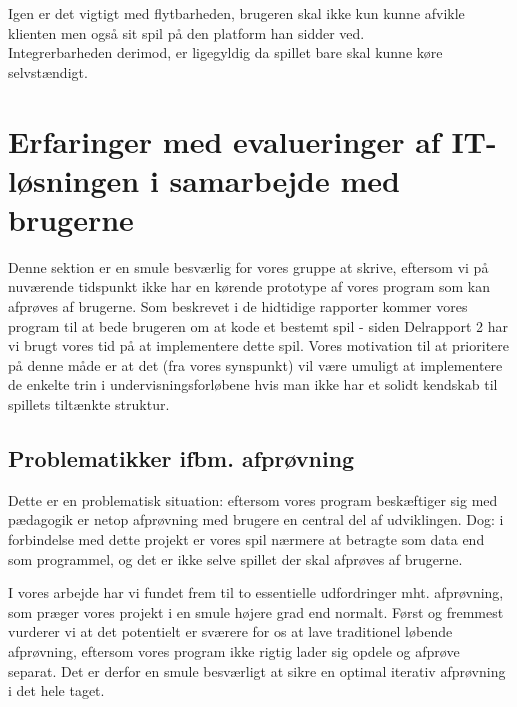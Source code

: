 \documentclass[10pt,a4paper,danish]{article}
\begin{document}
Igen er det vigtigt med flytbarheden, brugeren skal ikke kun kunne afvikle klienten men også sit spil på den platform han sidder ved.
\\

Integrerbarheden derimod, er ligegyldig da spillet bare skal kunne køre selvstændigt.



\section{Erfaringer med evalueringer af IT-løsningen i samarbejde med brugerne}
Denne sektion er en smule besværlig for vores gruppe at skrive, eftersom vi på nuværende
tidspunkt ikke har en kørende prototype af vores program som kan afprøves af brugerne. 
Som beskrevet i de hidtidige rapporter kommer vores program til at bede brugeren om at kode
et bestemt spil - siden Delrapport 2 har vi brugt vores tid på at implementere dette spil.
Vores motivation til at prioritere på denne måde er at det (fra vores synspunkt) vil være
umuligt at implementere de enkelte trin i undervisningsforløbene hvis man ikke har et 
solidt kendskab til spillets tiltænkte struktur.  

\subsection{Problematikker ifbm. afprøvning}
Dette er en problematisk situation: eftersom vores program beskæftiger sig med pædagogik
er netop afprøvning med brugere en central del af udviklingen. Dog: i forbindelse med dette 
projekt er vores spil nærmere at betragte som data end som 
programmel, og det er ikke selve spillet der skal afprøves af brugerne.

I vores arbejde har vi fundet frem til to essentielle udfordringer mht. afprøvning, som præger 
vores projekt i en smule højere grad end normalt. Først og fremmest vurderer vi at det potentielt 
er sværere for os at lave traditionel løbende afprøvning, eftersom vores 
program ikke rigtig lader sig opdele og afprøve separat. Det er derfor en smule besværligt at 
sikre en optimal iterativ afprøvning i det hele taget. 
\end{document}
